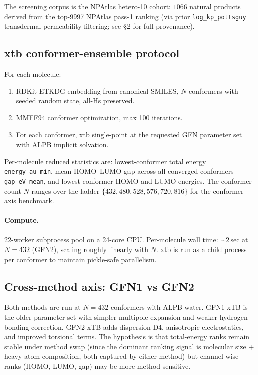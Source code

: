 \documentclass[11pt,a4paper]{article}
\begin{document}
The screening corpus is the NPAtlas hetero-10 cohort: $1066$ natural
products derived from the top-9997 NPAtlas pass-1 ranking
(via prior \texttt{log\_kp\_pottsguy} transdermal-permeability
filtering; see \citealp{paper_a_2026} \S 2 for full provenance).

\subsection{xtb conformer-ensemble protocol}

For each molecule:
\begin{enumerate}[leftmargin=*]
  \item RDKit ETKDG embedding from canonical SMILES, $N$ conformers
    with seeded random state, all-Hs preserved.
  \item MMFF94 conformer optimization, max 100 iterations.
  \item For each conformer, xtb single-point at the requested GFN
    parameter set with ALPB implicit solvation.
\end{enumerate}

Per-molecule reduced statistics are: lowest-conformer total energy
\texttt{energy\_au\_min}, mean HOMO--LUMO gap across all converged
conformers \texttt{gap\_eV\_mean}, and lowest-conformer HOMO and
LUMO energies. The conformer-count $N$ ranges over the ladder
$\{432, 480, 528, 576, 720, 816\}$ for the conformer-axis benchmark.

\paragraph{Compute.} 22-worker subprocess pool on a 24-core CPU.
Per-molecule wall time: $\sim 2$\,sec at $N = 432$ (GFN2), scaling
roughly linearly with $N$. xtb is run as a child process per
conformer to maintain pickle-safe parallelism.

\subsection{Cross-method axis: GFN1 vs GFN2}

Both methods are run at $N = 432$ conformers with ALPB water. GFN1-xTB
\citep{grimme2017gfn1} is the older parameter set with simpler
multipole expansion and weaker hydrogen-bonding correction.
GFN2-xTB \citep{bannwarth2019gfn2} adds dispersion D4, anisotropic
electrostatics, and improved torsional terms. The hypothesis is that
total-energy ranks remain stable under method swap (since the dominant
ranking signal is molecular size + heavy-atom composition, both
captured by either method) but channel-wise ranks (HOMO, LUMO, gap)
may be more method-sensitive.
\end{document}
